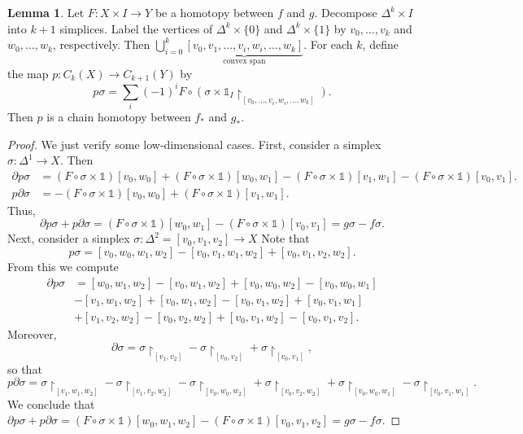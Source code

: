\documentclass[10pt,letterpaper,cm]{nupset}
\theoremstyle{definition}
\theoremstyle{theorem}
\newtheorem{lemma}[definition]{Lemma}
\theoremstyle{remark}
\newcommand{\1}{\mathbb{1}}
\newcommand{\0}{\vec 0}
\begin{document}
\begin{lemma}
Let $F: X \times I \to Y$ be a homotopy between $f$ and $g$. 
Decompose $\Delta^k \times I$ into $k+1$ simplices. Label the vertices of $\Delta^k \times \{0\}$ and $\Delta^k \times \{1\}$ by $v_0, \ldots, v_k$ and $w_0, \ldots, w_k$, respectively. Then $\bigcup_{i=0}^k \underbrace{[v_0, v_1, \ldots, v_i, w_i, \ldots, w_k]}_{\text{convex span}}$.
For each $k$, define the map $p: C_k(X) \to C_{k+1}(Y)$ by $$ p\sigma = \sum_i (-1)^i F \circ (\sigma \times \1_I \restriction_{[v_0, \ldots, v_i, w_i, \ldots, w_k]}).$$ Then $p$ is a chain homotopy between $f_{\ast}$ and $g_{\ast}$. 
\end{lemma}
\begin{proof}
We just verify some low-dimensional cases. First, consider a simplex $\sigma : \Delta^1 \to X$.  Then 
\begin{align*} \partial p \sigma & = (F \circ \sigma \times \1)[v_0,w_0]  + (F \circ \sigma \times \1)[w_0, w_1] - (F \circ \sigma \times \1)[v_1, w_1] - (F \circ \sigma \times \1)[v_0, v_1].
\\ p \partial \sigma & = - (F \circ \sigma \times \1)[v_0, w_0] + (F \circ \sigma \times \1)[v_1, w_1]. 
\end{align*}
Thus, 
\[
\partial p \sigma + p \partial \sigma = (F \circ \sigma \times \1)[w_0, w_1] - (F \circ \sigma \times \1)[v_0, v_1]= g\sigma - f \sigma.
\] Next, consider a simplex $\sigma : \Delta^2 = [v_0, v_1, v_2] \to X$ Note that
\[
p\sigma = [v_0, w_0, w_1, w_2] - [v_0,v_1, w_1, w_2] + [v_0, v_1, v_2, w_2].
\] From this we compute
\begin{align*}  \partial p \sigma  & = [w_0, w_1, w_2] - [v_0, w_1, w_2] + [v_0, w_0, w_2] - [v_0, w_0, w_1]
\\ & -[v_1, w_1, w_2] +[v_0, w_1, w_2] - [v_0, v_1, w_2] +[v_0, v_1, w_1] 
\\ & + [v_1, v_2, w_2]- [v_0, v_2, w_2] + [v_0, v_1, w_2]- [v_0, v_1, v_2].
\end{align*} 
Moreover,
\[
\partial \sigma = \sigma \restriction_{[v_1, v_2]} -  \sigma \restriction_{[v_0, v_2]} +  \sigma \restriction_{[v_0, v_1]},
\] so that
\[
p \partial \sigma = \sigma \restriction_{[v_1, w_1, w_2]} - \sigma \restriction_{[ v_1, v_2, w_2]} -  \sigma \restriction_{[ v_0, w_0, w_2]} 
+  \sigma \restriction_{[v_0, v_2, w_2 ]} +  \sigma \restriction_{[ v_0, w_0, w_1]} -  \sigma \restriction_{[ v_0, v_1, w_1]}.
\] We conclude that $\partial p \sigma + p \partial \sigma = (F \circ \sigma \times \1)[w_0, w_1, w_2] - (F \circ \sigma \times \1)[v_0, v_1, v_2] = g \sigma - f \sigma$.
\end{proof}
\end{document}
